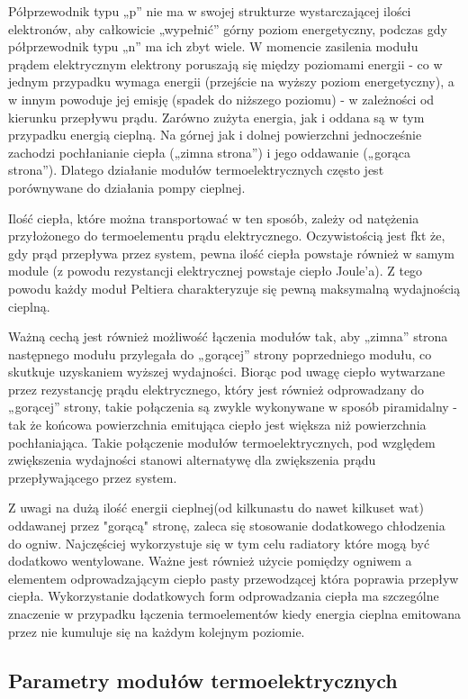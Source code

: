 \documentclass[oneside]{mgr}
\begin{document}
Półprzewodnik typu „p” nie ma w swojej strukturze wystarczającej ilości elektronów, aby całkowicie „wypełnić” górny poziom energetyczny, podczas gdy półprzewodnik typu „n” ma ich zbyt wiele. W momencie zasilenia modułu prądem elektrycznym elektrony poruszają się między poziomami energii - co w jednym przypadku wymaga energii (przejście na wyższy poziom energetyczny), a w innym powoduje jej emisję (spadek do niższego poziomu) - w zależności od kierunku przepływu prądu. Zarówno zużyta energia, jak i oddana są w tym przypadku energią cieplną. Na górnej jak i dolnej powierzchni jednocześnie zachodzi pochłanianie ciepła („zimna strona”) i jego oddawanie („gorąca strona”). Dlatego działanie modułów termoelektrycznych często jest porównywane do działania pompy cieplnej.

Ilość ciepła, które można transportować w ten sposób, zależy od natężenia przyłożonego do termoelementu prądu elektrycznego. Oczywistością jest fkt że, gdy prąd przepływa przez system, pewna ilość ciepła powstaje również w samym module (z powodu rezystancji elektrycznej powstaje ciepło Joule'a). Z tego powodu każdy moduł Peltiera charakteryzuje się  pewną maksymalną wydajnością cieplną.

Ważną cechą jest również możliwość łączenia modułów tak, aby „zimna” strona następnego modułu przylegała do „gorącej” strony poprzedniego modułu,
co skutkuje uzyskaniem wyższej wydajności. Biorąc pod uwagę ciepło wytwarzane przez rezystancję prądu elektrycznego, który jest również odprowadzany do „gorącej” strony, takie połączenia są zwykle wykonywane w sposób piramidalny - tak że końcowa powierzchnia emitująca ciepło jest większa niż powierzchnia pochłaniająca. Takie połączenie modułów termoelektrycznych, pod względem zwiększenia wydajności stanowi alternatywę dla zwiększenia prądu przepływającego przez system.

Z uwagi na dużą ilość energii cieplnej(od kilkunastu do nawet kilkuset wat) oddawanej przez "gorącą" stronę, zaleca się stosowanie dodatkowego chłodzenia do ogniw. Najczęściej wykorzystuje się w tym celu radiatory które mogą być dodatkowo wentylowane. Ważne jest również użycie pomiędzy ogniwem a elementem odprowadzającym ciepło pasty przewodzącej która poprawia przepływ ciepła. Wykorzystanie dodatkowych form odprowadzania ciepła ma szczególne znaczenie w przypadku łączenia termoelementów kiedy energia cieplna emitowana przez nie kumuluje się na każdym kolejnym poziomie. 

\subsection{Parametry modułów termoelektrycznych}
\end{document}
